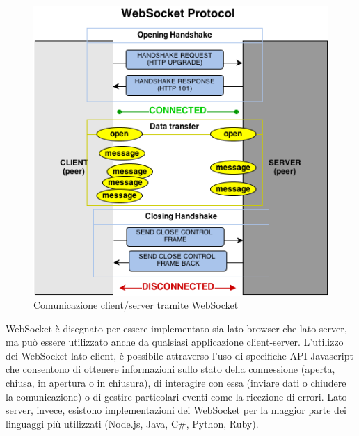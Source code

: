 \begin{figure}[H]
	\centering
	\includegraphics[width=\textwidth]{images/websocketProtocol.png}
	\caption{Comunicazione client/server tramite WebSocket}
	\label{fig:websocketProtocol}
\end{figure}
WebSocket è disegnato per essere implementato sia lato browser che lato server, ma può essere utilizzato anche da qualsiasi applicazione client-server. L'utilizzo dei WebSocket lato client, è possibile attraverso l'uso di specifiche API Javascript che consentono di ottenere informazioni sullo stato della connessione (aperta, chiusa, in apertura o in chiusura), di interagire con essa (inviare dati o chiudere la comunicazione) o di gestire particolari eventi come la ricezione di errori. Lato server, invece, esistono implementazioni dei WebSocket per la maggior parte dei linguaggi più utilizzati (Node.js, Java, C\#, Python, Ruby).

